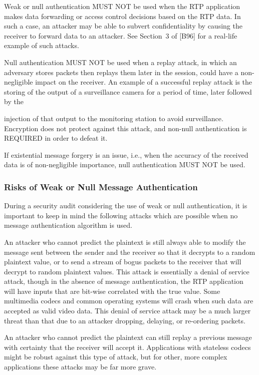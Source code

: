 \documentclass{article}
\begin{document}
Weak or null authentication MUST NOT be used when the RTP application makes data forwarding or access control decisions based on the RTP data.  In such a case, an attacker may be able to subvert confidentiality by causing the receiver to forward data to an attacker.  See Section~3 of [B96] for a real-life example of such attacks.

Null authentication MUST NOT be used when a replay attack, in which an adversary stores packets then replays them later in the session, could have a non-negligible impact on the receiver.  An example of a successful replay attack is the storing of the output of a surveillance camera for a period of time, later followed by the

injection of that output to the monitoring station to avoid surveillance.  Encryption does not protect against this attack, and non-null authentication is REQUIRED in order to defeat it.

If existential message forgery is an issue, i.e., when the accuracy of the received data is of non-negligible importance, null authentication MUST NOT be used.

\subsubsection{Risks of Weak or Null Message Authentication}

During a security audit considering the use of weak or null authentication, it is important to keep in mind the following attacks which are possible when no message authentication algorithm is used.

An attacker who cannot predict the plaintext is still always able to modify the message sent between the sender and the receiver so that it decrypts to a random plaintext value, or to send a stream of bogus packets to the receiver that will decrypt to random plaintext values. This attack is essentially a denial of service attack, though in the absence of message authentication, the RTP application will have inputs that are bit-wise correlated with the true value.  Some multimedia codecs and common operating systems will crash when such data are accepted as valid video data.  This denial of service attack may be a much larger threat than that due to an attacker dropping, delaying, or re-ordering packets.

An attacker who cannot predict the plaintext can still replay a previous message with certainty that the receiver will accept it. Applications with stateless codecs might be robust against this type of attack, but for other, more complex applications these attacks may be far more grave.
\end{document}
